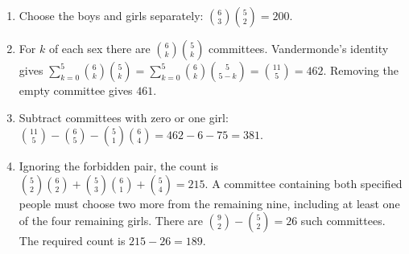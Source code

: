 \begin{enumerate}\item Choose the boys and girls separately: $\binom63\binom52=\boxed{200}$.\item For $k$ of each sex there are $\binom6k\binom5k$ committees. Vandermonde's identity gives $\sum_{k=0}^{5}\binom6k\binom5k=\sum_{k=0}^{5}\binom6k\binom5{5-k}=\binom{11}{5}=462$. Removing the empty committee gives $\boxed{461}$.\item Subtract committees with zero or one girl: $\binom{11}{5}-\binom65-\binom51\binom64=462-6-75=\boxed{381}$.\item Ignoring the forbidden pair, the count is $\binom52\binom62+\binom53\binom61+\binom54=215$. A committee containing both specified people must choose two more from the remaining nine, including at least one of the four remaining girls. There are $\binom92-\binom52=26$ such committees. The required count is $215-26=\boxed{189}$.\end{enumerate}
